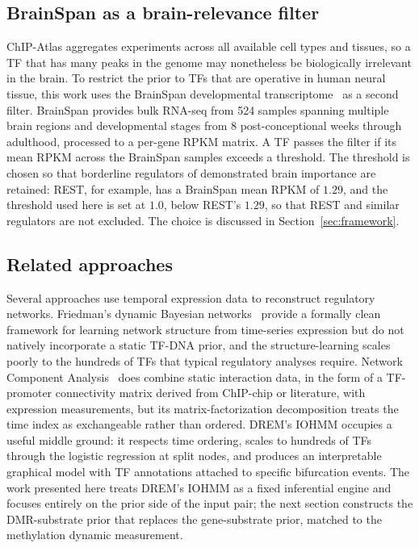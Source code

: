 \subsection{BrainSpan as a brain-relevance filter}

ChIP-Atlas aggregates experiments across all available cell types and tissues, so a TF that has many peaks in the genome may nonetheless be biologically irrelevant in the brain. To restrict the prior to TFs that are operative in human neural tissue, this work uses the BrainSpan developmental transcriptome~\cite{miller2014brainspan} as a second filter. BrainSpan provides bulk RNA-seq from 524 samples spanning multiple brain regions and developmental stages from 8 post-conceptional weeks through adulthood, processed to a per-gene RPKM matrix. A TF passes the filter if its mean RPKM across the BrainSpan samples exceeds a threshold. The threshold is chosen so that borderline regulators of demonstrated brain importance are retained: REST, for example, has a BrainSpan mean RPKM of $1.29$, and the threshold used here is set at $1.0$, below REST's $1.29$, so that REST and similar regulators are not excluded. The choice is discussed in Section~\ref{sec:framework}.

\subsection{Related approaches}

Several approaches use temporal expression data to reconstruct regulatory networks. Friedman's dynamic Bayesian networks~\cite{friedman1998dbn} provide a formally clean framework for learning network structure from time-series expression but do not natively incorporate a static TF-DNA prior, and the structure-learning scales poorly to the hundreds of TFs that typical regulatory analyses require. Network Component Analysis~\cite{liao2003nca} does combine static interaction data, in the form of a TF-promoter connectivity matrix derived from ChIP-chip or literature, with expression measurements, but its matrix-factorization decomposition treats the time index as exchangeable rather than ordered. DREM's IOHMM occupies a useful middle ground: it respects time ordering, scales to hundreds of TFs through the logistic regression at split nodes, and produces an interpretable graphical model with TF annotations attached to specific bifurcation events. The work presented here treats DREM's IOHMM as a fixed inferential engine and focuses entirely on the prior side of the input pair; the next section constructs the DMR-substrate prior that replaces the gene-substrate prior, matched to the methylation dynamic measurement.

